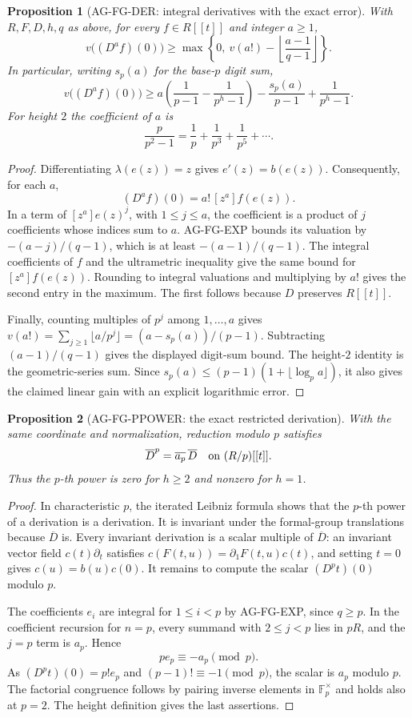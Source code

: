 \documentclass[11pt,a4paper]{article}
\newtheorem{proposition}{Proposition}
\begin{document}
\begin{proposition}[AG-FG-DER: integral derivatives with the exact error]
With $R,F,D,h,q$ as above, for every $f\in R[[t]]$ and integer
$a\ge1$,
\begin{equation}\label{eq:ag-height-derivative}
 v\bigl((D^af)(0)\bigr)\ge
 \max\left\{0,\ v(a!)-
                 \left\lfloor\frac{a-1}{q-1}\right\rfloor\right\}.
\end{equation}
In particular, writing $s_p(a)$ for the base-$p$ digit sum,
\[
 v\bigl((D^af)(0)\bigr)\ge
 a\left(\frac1{p-1}-\frac1{p^h-1}\right)
 -\frac{s_p(a)}{p-1}+\frac1{p^h-1}.
\]
For height $2$ the coefficient of $a$ is
\[
 \frac{p}{p^2-1}=\frac1p+\frac1{p^3}+\frac1{p^5}+\cdots.
\]
\end{proposition}
\begin{proof}
Differentiating $\lambda(e(z))=z$ gives $e'(z)=b(e(z))$.
Consequently, for each $a$,
\[
 (D^af)(0)=a!\,[z^a]f(e(z)).
\]
In a term of $[z^a]e(z)^j$, with $1\le j\le a$, the
coefficient is a product of $j$ coefficients whose indices sum
to $a$. AG-FG-EXP bounds its valuation by $-(a-j)/(q-1)$,
which is at least $-(a-1)/(q-1)$. The integral coefficients of
$f$ and the ultrametric inequality give the same bound for
$[z^a]f(e(z))$. Rounding to integral valuations and multiplying
by $a!$ gives the second entry in the maximum. The first follows
because $D$ preserves $R[[t]]$.

Finally, counting multiples of $p^j$ among $1,\ldots,a$ gives
$v(a!)=\sum_{j\ge1}\lfloor a/p^j\rfloor
=(a-s_p(a))/(p-1)$. Subtracting $(a-1)/(q-1)$ gives the
displayed digit-sum bound. The height-$2$ identity is the
geometric-series sum. Since
$s_p(a)\le(p-1)(1+\lfloor\log_pa\rfloor)$, it also gives the
claimed linear gain with an explicit logarithmic error.
\end{proof}

\begin{proposition}[AG-FG-PPOWER: the exact restricted derivation]
With the same coordinate and normalization, reduction modulo $p$
satisfies
\[
 \overline D^{p}=\overline{a_p}\,\overline D
             \quad\hbox{on }(R/p)[[t]].
\]
Thus the $p$-th power is zero for $h\ge2$ and nonzero for $h=1$.
\end{proposition}
\begin{proof}
In characteristic $p$, the iterated Leibniz formula shows that
the $p$-th power of a derivation is a derivation. It is invariant
under the formal-group translations because $\overline D$ is.
Every invariant derivation is a scalar multiple of
$\overline D$: an invariant vector field $c(t)\partial_t$
satisfies $c(F(t,u))=\partial_1F(t,u)c(t)$, and setting $t=0$
gives $c(u)=b(u)c(0)$. It remains to compute the scalar
$(D^pt)(0)$ modulo $p$.

The coefficients $e_i$ are integral for $1\le i<p$ by
AG-FG-EXP, since $q\ge p$. In the coefficient recursion for
$n=p$, every summand with $2\le j<p$ lies in $pR$, and the
$j=p$ term is $a_p$. Hence
\[
 pe_p\equiv-a_p\pmod p.
\]
As $(D^pt)(0)=p!e_p$ and $(p-1)!\equiv-1\pmod p$,
the scalar is $a_p$ modulo $p$. The factorial congruence follows
by pairing inverse elements in $\mathbb F_p^\times$ and holds
also at $p=2$. The height definition gives the last assertions.
\end{proof}
\end{document}
